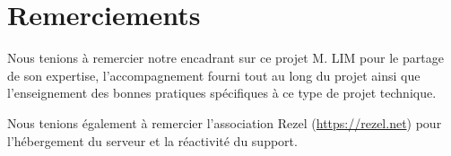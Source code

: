 \section*{Remerciements}

Nous tenions à remercier notre encadrant sur ce projet M. LIM pour le partage de son expertise, l'accompagnement fourni tout au long du projet ainsi que l'enseignement des bonnes pratiques spécifiques à ce type de projet technique.

Nous tenions également à remercier l'association Rezel (\url{https://rezel.net}) pour l'hébergement du serveur et la réactivité du support.